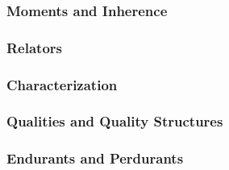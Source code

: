 \documentclass{article}
\newcommand{\BeginExistentialDependence}{961}
\newcommand{\EndExistentialDependence}{983}
\newcommand{\BeginMomentsAndInherence}{985}
\newcommand{\EndMomentsAndInherence}{1055}
\newcommand{\BeginRelators}{1057}
\newcommand{\EndRelators}{1137}
\newcommand{\BeginCharacterization}{1139}
\newcommand{\EndCharacterization}{1156}
\newcommand{\BeginQualitiesAndQualityStructures}{1162}
\newcommand{\EndQualitiesAndQualityStructures}{1180}
\newcommand{\BeginEndurantsAndPerdurants}{1182}
\newcommand{\EndEndurantsAndPerdurants}{1201}
\begin{document}


\subsubsection{Moments and Inherence}



\subsubsection{Relators}



\subsubsection{Characterization}



\subsubsection{Qualities and Quality Structures}



\subsubsection{Endurants and Perdurants}



% 
% 
\end{document}
